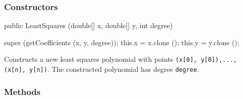\subsubsection* {Constructors}
\begin{code}

   public LeastSquares (double[] x, double[] y, int degree)\begin{hide} {
      super (getCoefficients (x, y, degree));
      this.x = x.clone ();
      this.y = y.clone ();
   }\end{hide}
\end{code}
\begin{tabb}   Constructs a new least squares polynomial with points \texttt{(x[0],
 y[0]),..., (x[n], y[n])}. The constructed polynomial has degree
 \texttt{degree}.
\end{tabb}
\begin{htmlonly}
\end{htmlonly}

\subsubsection* {Methods}

